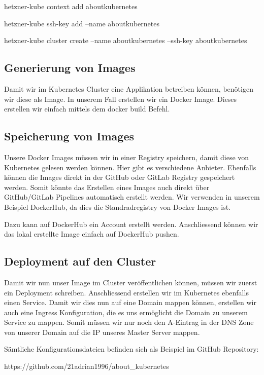 hetzner-kube context add aboutkubernetes

hetzner-kube ssh-key add --name aboutkubernetes  

hetzner-kube cluster create --name aboutkubernetes --ssh-key aboutkubernetes

\subsection{Generierung von Images}
Damit wir im Kubernetes Cluster eine Applikation betreiben können, benötigen wir diese als Image. In unserem Fall erstellen wir ein Docker Image. 
Dieses erstellen wir einfach mittels dem docker build Befehl.

\subsection{Speicherung von Images}
Unsere Docker Images müssen wir in einer Registry speichern, damit diese von Kubernetes gelesen werden können. Hier gibt es verschiedene Anbieter. Ebenfalls können die Images direkt in der GitHub oder GitLab Registry gespeichert werden.
Somit könnte das Erstellen eines Images auch direkt über GitHub/GitLab Pipelines automatisch erstellt werden.
Wir verwenden in unserem Beispiel DockerHub, da dies die Standradregistry von Docker Images ist.

Dazu kann auf DockerHub ein Account erstellt werden. Anschliessend können wir das lokal erstellte Image einfach auf DockerHub pushen.

\subsection{Deployment auf den Cluster}
Damit wir nun unser Image im Cluster veröffentlichen können, müssen wir zuerst ein Deployment schreiben. Anschliessend erstellen wir im Kubernetes ebenfalls einen Service. Damit wir dies nun auf eine Domain mappen können, erstellen wir auch eine Ingress Konfiguration, die es uns ermöglicht die Domain zu unserem Service zu mappen.
Somit müssen wir nur noch den A-Eintrag in der DNS Zone von unserer Domain auf die IP unseres Master Server mappen.


Sämtliche Konfigurationsdateien befinden sich als Beispiel im GitHub Repository:

https://github.com/21adrian1996/about\_kubernetes
\clearpage